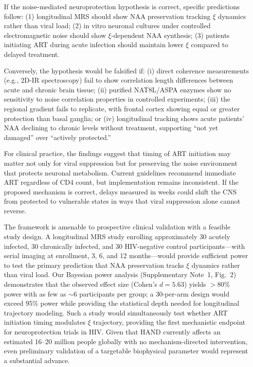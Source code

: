 \documentclass[10pt,a4paper]{article}
\begin{document}
If the noise-mediated neuroprotection hypothesis is correct, specific predictions follow: (1) longitudinal MRS should show NAA preservation tracking $\xi$ dynamics rather than viral load; (2) in vitro neuronal cultures under controlled electromagnetic noise should show $\xi$-dependent NAA synthesis; (3) patients initiating ART during acute infection should maintain lower $\xi$ compared to delayed treatment.

Conversely, the hypothesis would be falsified if: (i) direct coherence measurements (e.g., 2D-IR spectroscopy) fail to show correlation length differences between acute and chronic brain tissue; (ii) purified NAT8L/ASPA enzymes show no sensitivity to noise correlation properties in controlled experiments; (iii) the regional gradient fails to replicate, with frontal cortex showing equal or greater protection than basal ganglia; or (iv) longitudinal tracking shows acute patients' NAA declining to chronic levels without treatment, supporting ``not yet damaged'' over ``actively protected.''

For clinical practice, the findings suggest that timing of ART initiation may matter not only for viral suppression but for preserving the noise environment that protects neuronal metabolism. Current guidelines recommend immediate ART regardless of CD4 count\cite{palella1998}, but implementation remains inconsistent. If the proposed mechanism is correct, delays measured in weeks could shift the CNS from protected to vulnerable states in ways that viral suppression alone cannot reverse.

The framework is amenable to prospective clinical validation with a feasible study design. A longitudinal MRS study enrolling approximately 30 acutely infected, 30 chronically infected, and 30 HIV-negative control participants---with serial imaging at enrollment, 3, 6, and 12 months---would provide sufficient power to test the primary prediction that NAA preservation tracks $\xi$ dynamics rather than viral load. Our Bayesian power analysis (Supplementary Note~1, Fig.~2) demonstrates that the observed effect size (Cohen's $d = 5.63$) yields $>$80\% power with as few as $\sim$6 participants per group; a 30-per-arm design would exceed 95\% power while providing the statistical depth needed for longitudinal trajectory modeling. Such a study would simultaneously test whether ART initiation timing modulates $\xi$ trajectory, providing the first mechanistic endpoint for neuroprotection trials in HIV. Given that HAND currently affects an estimated 16--20 million people globally with no mechanism-directed intervention, even preliminary validation of a targetable biophysical parameter would represent a substantial advance.
\end{document}
